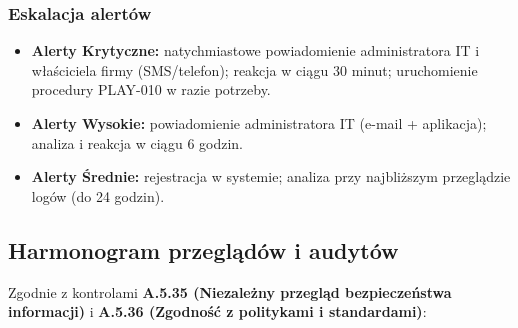 \documentclass[12pt,a4paper]{article}
\providecommand{\tightlist}{\setlength{\itemsep}{0pt}\setlength{\parskip}{0pt}}
\begin{document}
\subsubsection{Eskalacja alertów}\label{eskalacja-alertow}
\begin{itemize}
\tightlist
\item
  \textbf{Alerty Krytyczne:} natychmiastowe powiadomienie administratora IT i właściciela firmy (SMS/telefon); reakcja w ciągu 30 minut; uruchomienie procedury PLAY-010 w razie potrzeby.
\item
  \textbf{Alerty Wysokie:} powiadomienie administratora IT (e-mail + aplikacja); analiza i reakcja w ciągu 6 godzin.
\item
  \textbf{Alerty Średnie:} rejestracja w systemie; analiza przy najbliższym przeglądzie logów (do 24 godzin).
\end{itemize}

\subsection{Harmonogram przeglądów i audytów}\label{harmonogram-przegladow-i-audytow}

Zgodnie z kontrolami \textbf{A.5.35 (Niezależny przegląd bezpieczeństwa informacji)} i \textbf{A.5.36 (Zgodność z politykami i standardami)}:
\end{document}
